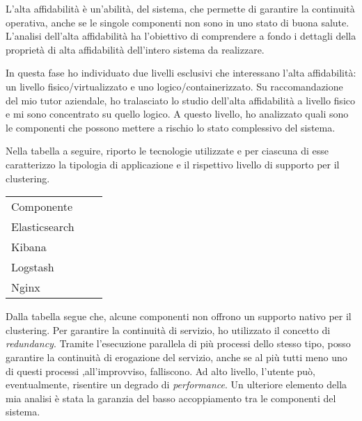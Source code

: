 L'alta affidabilità è un'abilità, del sistema, che permette
di  garantire la continuità operativa, anche se le singole 
componenti non sono in uno stato di buona salute. L'analisi 
dell'alta affidabilità ha l'obiettivo di comprendere 
a fondo i dettagli della proprietà di alta affidabilità
dell'intero sistema da realizzare. 

In questa fase ho individuato due livelli esclusivi che interessano
l'alta affidabilità: un livello fisico/virtualizzato e uno 
logico/containerizzato. Su raccomandazione del mio tutor aziendale, 
ho tralasciato lo studio dell'alta affidabilità 
a livello fisico e mi sono concentrato su quello logico.
A questo livello, ho analizzato quali sono le componenti 
che possono mettere a rischio lo stato complessivo del sistema.

Nella tabella a seguire, riporto le tecnologie utilizzate e per ciascuna 
di esse caratterizzo la tipologia di applicazione e il rispettivo livello 
di supporto per il clustering.

\begin{center}
\begin{tabular}
	{l||p{5cm}||p{5cm}}	
	\arrayrulecolor{white}
	\rowcolor{glaucous}	
	Componente 	&  
	\makebox[4cm][c]{Tipologia} & 	
	\makebox[5cm][c]{Supporto nativo clustering} \\ 
	\rowcolor{lightcornflowerblue}
	Elasticsearch & 
	\makebox[4cm][c]{Applicazione Java} & 
	\makebox[5cm][c]{Si} \\
	\rowcolor{moonstoneblue}
	Kibana & 
	\makebox[4cm][c]{Applicazione Javascript} & 
	\makebox[5cm][c]{No} \\
	\rowcolor{lightcornflowerblue}
	Logstash & 
	\makebox[4cm][c]{Applicazione Java} & 
	\makebox[5cm][c]{No} \\
	\rowcolor{moonstoneblue}
	Nginx & 
	\makebox[4cm][c]{Applicazione C++} & 
	\makebox[5cm][c]{Si} \\
\end{tabular}		  
\end{center}

Dalla tabella segue che, alcune componenti non 
offrono un supporto nativo per il clustering.
Per garantire la continuità di servizio, ho 
utilizzato il concetto di \textit{redundancy}. 
Tramite l'esecuzione parallela di più 
processi dello stesso tipo, posso garantire
la continuità di erogazione del servizio, anche 
se al più tutti meno uno di questi processi
,all'improvviso, falliscono. Ad alto livello, 
l'utente può, eventualmente, risentire un 
degrado di \textit{performance}. 
Un ulteriore elemento della mia analisi è stata 
la garanzia del basso accoppiamento 
tra le componenti del sistema. 

